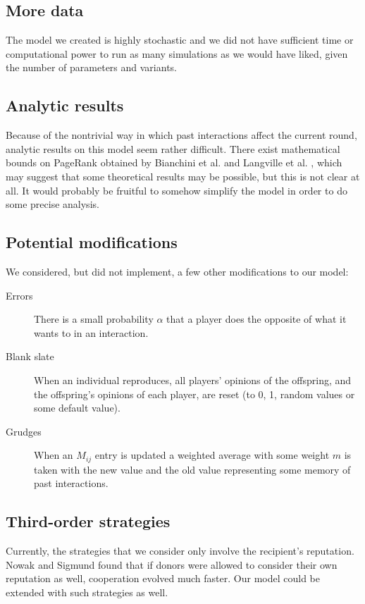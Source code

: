 \documentclass{amsart}
\begin{document}
\subsection{More data}

The model we created is highly stochastic and we did not have
sufficient time or computational power to run as many simulations as
we would have liked, given the number of parameters and variants.

\subsection{Analytic results}

Because of the nontrivial way in which past interactions affect the
current round, analytic results on this model seem rather
difficult. There exist mathematical bounds on PageRank obtained by
Bianchini et al. \cite{bianchini_Inside_2005} and Langville et
al. \cite{langville_deeper_2004}, which may suggest that some
theoretical results may be possible, but this is not clear at all. It
would probably be fruitful to somehow simplify the model in order to
do some precise analysis.

\subsection{Potential modifications}

We considered, but did not implement, a few other modifications to our
model:
\begin{description}
\item[Errors] There is a small probability $\alpha$ that a player does
  the opposite of what it wants to in an interaction.
\item[Blank slate] When an individual reproduces, all players'
  opinions of the offspring, and the offspring's opinions of each
  player, are reset (to 0, 1, random values or some default value).
\item[Grudges] When an $M_{ij}$ entry is updated a weighted average
  with some weight $m$ is taken with the new value and the old value
  representing some memory of past interactions.
\end{description}

\subsection{Third-order strategies}

Currently, the strategies that we consider only involve the
recipient's reputation. Nowak and Sigmund \cite{nowak_evolution_1998}
found that if donors were allowed to consider their own reputation as
well, cooperation evolved much faster. Our model could be extended
with such strategies as well.
\end{document}
